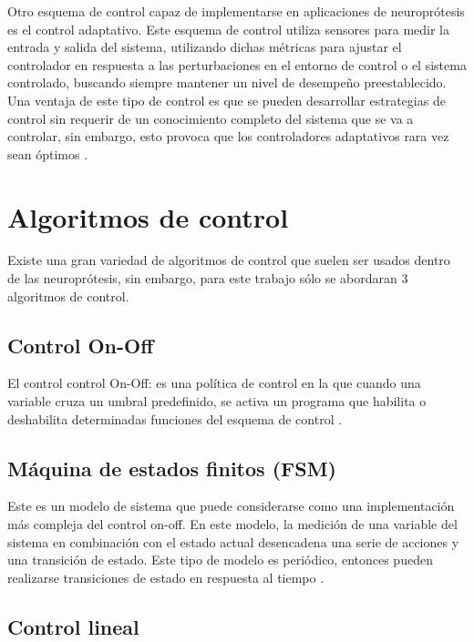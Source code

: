 Otro esquema de control capaz de implementarse en aplicaciones de neuroprótesis es el control adaptativo. Este esquema de control utiliza sensores para medir la entrada y salida del sistema, utilizando dichas métricas para ajustar el controlador en respuesta a las perturbaciones en el entorno de control o el sistema controlado, buscando siempre mantener un nivel de desempeño preestablecido. Una ventaja de este tipo de control es que se pueden desarrollar estrategias de control sin requerir de un conocimiento completo del sistema que se va a controlar, sin embargo, esto provoca que los controladores adaptativos rara vez sean óptimos \cite{Wright2016}.

{\color{red}\section{Algoritmos de control}}
Existe una gran variedad de algoritmos de control que suelen ser usados dentro de las neuroprótesis, sin embargo, para este trabajo sólo se abordaran 3 algoritmos de control.

\subsection{Control On-Off}
El control control On-Off: es una política de control en la que cuando una variable cruza un umbral predefinido, se activa un programa que habilita o deshabilita determinadas funciones del esquema de control \cite{Wright2016}.

\subsection{Máquina de estados finitos (FSM)}
Este es un modelo de sistema que puede considerarse como una implementación más compleja del control on-off. En este modelo, la medición de una variable del sistema en combinación con el estado actual desencadena una serie de acciones y una transición de estado. Este tipo de modelo es periódico, entonces pueden realizarse transiciones de estado en respuesta al tiempo \cite{Wright2016}.

{\color{red}\subsection{Control lineal}}

